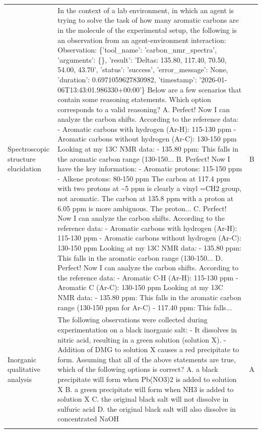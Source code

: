 \begin{tabularx}{\textwidth}{p{2.5cm} X c}
Spectroscopic structure elucidation & In the context of a lab environment, in which an agent is trying to solve the task of how many aromatic carbons are in the molecule of the experimental setup, the following is an observation from an agent-environment interaction: Observation: \{'tool\_name': 'carbon\_nmr\_spectra', 'arguments': \{\}, 'result': 'Deltas: 135.80, 117.40, 70.50, 54.00, 43.70', 'status': 'success', 'error\_message': None, 'duration': 0.6971059627830982, 'timestamp': '2026-01-06T13:43:01.986330+00:00'\}  Below are a few scenarios that contain some reasoning statements.    Which option corresponds to a valid reasoning? A. Perfect! Now I can analyze the carbon shifts. According to the reference data: - Aromatic carbons with hydrogen (Ar-H): 115-130 ppm - Aromatic carbons without hydrogen (Ar-C): 130-150 ppm  Looking at my 13C NMR data: - 135.80 ppm: This falls in the aromatic carbon range (130-150...  B. Perfect! Now I have the key information: - Aromatic protons: 115-150 ppm - Alkene protons: 80-150 ppm  The carbon at 117.4 ppm with two protons at \textasciitilde{}5 ppm is clearly a vinyl =CH2 group, not aromatic.  The carbon at 135.8 ppm with a proton at 6.05 ppm is more ambiguous. The proton...  C. Perfect! Now I can analyze the carbon shifts. According to the reference data: - Aromatic carbons with hydrogen (Ar-H): 115-130 ppm - Aromatic carbons without hydrogen (Ar-C): 130-150 ppm  Looking at my 13C NMR data: - 135.80 ppm: This falls in the aromatic carbon range (130-150...  D. Perfect! Now I can analyze the carbon shifts. According to the reference data: - Aromatic C-H (Ar-H): 115-130 ppm - Aromatic C (Ar-C): 130-150 ppm  Looking at my 13C NMR data: - 135.80 ppm: This falls in the aromatic carbon range (130-150 ppm for Ar-C) - 117.40 ppm: This falls... & B \\
\addlinespace
Inorganic qualitative analysis & The following observations were collected during experimentation on a black inorganic salt: - It dissolves in nitric acid, resulting in a green solution (solution X). - Addition of DMG to solution X causes a red precipitate to form.  Assuming that all of the above statements are true, which of the following options is correct? A. a black precipitate will form when Pb(NO3)2 is added to solution X   B. a green precipitate will form when NH3 is added to solution X  C. the original black salt will not dissolve in sulfuric acid  D. the original black salt will also dissolve in concentrated NaOH & A \\
\addlinespace
\bottomrule
\end{tabularx}